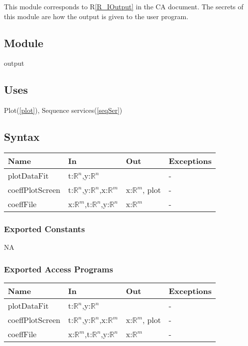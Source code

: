 \documentclass[12pt, titlepage]{article}
\begin{document}
This module corresponds to R\ref{R_IOutput} in the CA document. The secrets of 
this module are how the output is given to the user program.

\subsection{Module}

output

\subsection{Uses}

Plot(\ref{plot}), Sequence services(\ref{seqSer})

\subsection{Syntax}

\begin{tabular}{p{3cm} p{3cm} p{4cm} >{\raggedright\arraybackslash}p{5cm}}
	\toprule
	\textbf{Name} & \textbf{In} & \textbf{Out} & \textbf{Exceptions} \\
	\midrule
	
	plotDataFit & t:$\mathbb{R}^n$,y:$\mathbb{R}^n$ &  & -  \\
	
	coeffPlotScreen & t:$\mathbb{R}^n$,y:$\mathbb{R}^n$,x:$\mathbb{R}^m$ & 
	x:$\mathbb{R}^m$, plot &  -\\
	
	coeffFile& x:$\mathbb{R}^m$,t:$\mathbb{R}^n$,y:$\mathbb{R}^n$ & 
	x:$\mathbb{R}^m$
	& - \\
	
	\bottomrule
\end{tabular}


\subsubsection{Exported Constants}
NA

\subsubsection{Exported Access Programs}
\begin{tabular}{p{3cm} p{3cm} p{4cm} >{\raggedright\arraybackslash}p{5cm}}
	\toprule
	\textbf{Name} & \textbf{In} & \textbf{Out} & \textbf{Exceptions} \\
	\midrule
	
	plotDataFit & t:$\mathbb{R}^n$,y:$\mathbb{R}^n$ &  & -  \\
	
	coeffPlotScreen & t:$\mathbb{R}^n$,y:$\mathbb{R}^n$,x:$\mathbb{R}^m$ & 
	x:$\mathbb{R}^m$, plot &  -\\
	
	coeffFile& x:$\mathbb{R}^m$,t:$\mathbb{R}^n$,y:$\mathbb{R}^n$ & 
	x:$\mathbb{R}^m$
	& - \\
		
	\bottomrule
\end{tabular}
\end{document}

